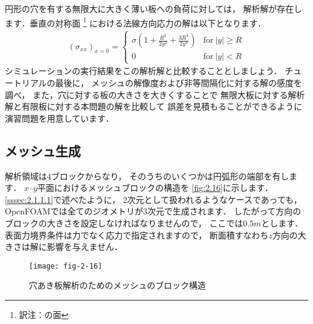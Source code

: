 円形の穴を有する無限大に大きく薄い板への負荷に対しては，
解析解が存在します．垂直の対称面%
\footnote{訳注：の面}%
における法線方向応力の解は以下となります．
\begin{align}
 \label{eq:2.14}
 (\sigma_{xx})_{x=0} =
 \begin{cases}
  \displaystyle
  \sigma\left(1 + \frac{R^{2}}{2y^{2}} + \frac{3R^{4}}{2y^{4}}\right)
  & \text{for}\ |y| \ge R \\
  0 & \text{for}\ |y| < R
 \end{cases}
\end{align}
シミュレーションの実行結果をこの解析解と比較することとしましょう．
チュートリアルの最後に，
メッシュの解像度および非等間隔化に対する解の感度を調べ，
また，穴に対する板の大きさを大きくすることで
無限大板に対する解析解と有限板に対する本問題の解を比較して
誤差を見積もることができるように演習問題を用意しています．


\subsection{メッシュ生成}
\label{ssec:2.2.1}
解析領域は4ブロックからなり，
そのうちのいくつかは円弧形の端部を有します．
$x$--$y$平面におけるメッシュブロックの構造を
\autoref{fig:2.16}に示します．
\autoref{sssec:2.1.1.1}で述べたように，
2次元として扱われるようなケースであっても，
OpenFOAMでは全てのジオメトリが3次元で生成されます．
したがって方向のブロックの大きさを設定しなければなりませんので，
ここでは$0.5\unit{m}$とします．
表面力境界条件は力でなく応力で指定されますので，
断面積すなわち$z$方向の大きさは解に影響を与えません．


\begin{figure}[ht]
 \texttt{[image: fig-2-16]}
 \caption{穴あき板解析のためのメッシュのブロック構造}
 \label{fig:2.16}
\end{figure}


